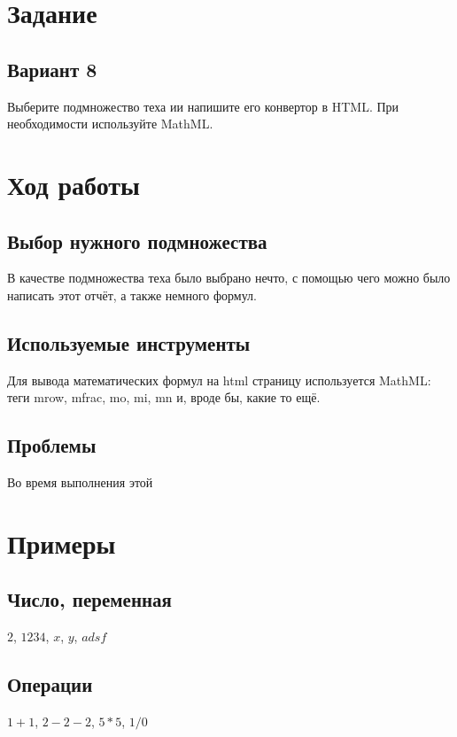 \section{Задание}
\subsection{Вариант 8}

Выберите подмножество теха ии напишите его конвертор в HTML.
При необходимости используйте MathML.

\section{Ход работы}
\subsection{Выбор нужного подмножества}

В качестве подмножества теха было выбрано нечто, с помощью чего можно было 
написать этот отчёт, а также немного формул.

\subsection{Используемые инструменты}

Для вывода математических формул на html страницу используется MathML: теги
mrow, mfrac, mo, mi, mn и, вроде бы, какие то ещё.

\subsection{Проблемы}

Во время выполнения этой 

\section{Примеры}

\subsection{Число, переменная}

$2$, $1234$, $x$, $y$, $adsf$

\subsection{Операции}

$1 + 1$, $2 - 2 - 2$, $5 * 5$, $1/   0$

